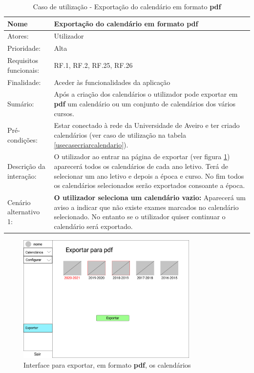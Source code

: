 \documentclass[11pt, twoside]{report}
\begin{document}
\def\arraystretch{1.5}
\begin{table}[H]
	\caption{Caso de utilização - Exportação do calendário em formato \textbf{pdf}}
	\begin{center}	
		\begin{tabularx}{\textwidth}{|l|X|}
			\hline
			\textbf{Nome }	& \textbf{Exportação do calendário em formato \textbf{pdf}} \\
			\hline
			Atores: & Utilizador \\
			\hline
			Prioridade: & Alta \\
			\hline
			Requisitos funcionais:& RF.1, RF.2, RF.25, RF.26 \\
			\hline
			Finalidade: & Aceder às funcionalidades da aplicação\\
			\hline
			Sumário: & Após a criação dos calendários o utilizador pode exportar em \textbf{pdf} um calendário ou um conjunto de calendários dos vários cursos. \\
			\hline
			Pré-condições: & Estar conectado à rede da Universidade de Aveiro e ter criado calendários (ver caso de utilização na tabela \ref{usecasecriarcalendario}).\\
			\hline
			Descrição da interação: &  O utilizador ao entrar na página de exportar (ver figura \ref{interfaceexportarpdf}) aparecerá todos os calendários de cada ano letivo.
			Terá de selecionar um ano letivo e depois a época e curso. No fim todos os calendários selecionados serão exportados consoante a época. \\
			\hline
			Cenário alternativo 1:&\textbf{O utilizador seleciona um calendário vazio:} Aparecerá um aviso a indicar que não existe exames marcados no calendário selecionado.
			No entanto se o utilizador quiser continuar o calendário será exportado.\\
			\hline
			
		\end{tabularx}
	\end{center}
\end{table}

	\begin{figure}[H] 
	\centering 
	\includegraphics[width=0.8\textwidth,height=0.8\textheight,keepaspectratio]{image/prototipowireframes/exportarpdf}
	\caption{Interface para exportar, em formato \textbf{pdf}, os calendários}
	\label{interfaceexportarpdf}
\end{figure}
\end{document}
